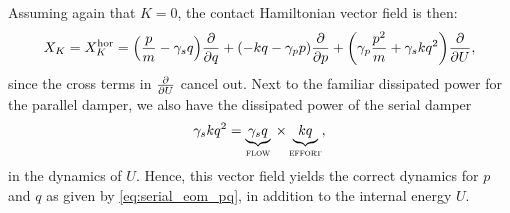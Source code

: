 Assuming again that \(K = 0\), the contact Hamiltonian vector field is then:
\begin{equation}
     X_K = X_K^\text{hor} = \qty(\frac{p}{m} - \gamma_s q)\pdv{}{q} + \qty(-kq -\gamma_p p)\pdv{}{p} + \qty(\gamma_p\frac{p^2}{m} + \gamma_s kq^2 )\pdv{}{U},
\end{equation}
since the cross terms in \(\pdv{}{U}\) cancel out. Next to the familiar dissipated power for the parallel damper, we also have the dissipated power of the serial damper
\begin{equation}
     \gamma_s kq^2 = \underbrace{\gamma_s q}_\text{\textsc{flow}} \: \times \underbrace{kq}_\text{\textsc{effort}},
\end{equation} 
in the dynamics of \(U\). Hence, this vector field yields the correct dynamics for \(p\) and \(q\) as given by \cref{eq:serial_eom_pq}, in addition to the internal energy \(U\).


